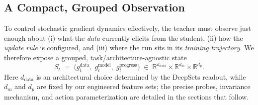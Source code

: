 \documentclass[11pt]{article}
\newcommand{\R}{\mathbb{R}}
\newcommand{\1}{\mathbf{1}}
\begin{document}
\subsection{A Compact, Grouped Observation}\label{sec:state}
To control stochastic gradient dynamics effectively, the teacher must observe just enough about (i) what the \emph{data} currently elicits from the student, (ii) how the \emph{update rule} is configured, and (iii) where the run sits in its \emph{training trajectory}. We therefore expose a grouped, task/architecture-agnostic state
\begin{equation}
\label{eq:grouped-state}
S_t \;=\; \big( g^{\text{data}}_t,\; g^{\text{model}}_t,\; g^{\text{progress}}_t \big)
\;\in\; \R^{d_{\text{data}}}\times\R^{d_m}\times\R^{d_p}.
\end{equation}
Here $d_{\text{data}}$ is an architectural choice determined by the DeepSets readout, while $d_m$ and $d_p$ are fixed by our engineered feature sets; the precise probes, invariance mechanism, and action parameterization are detailed in the sections that follow.
\end{document}
